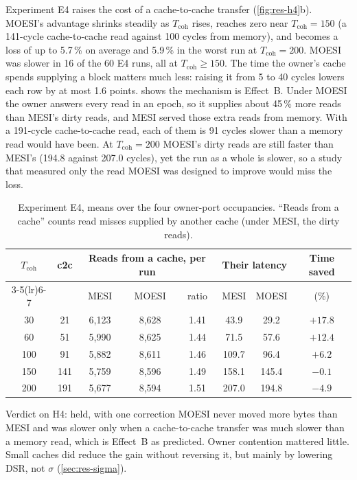 Experiment E4 raises the cost of a cache-to-cache transfer (\cref{fig:res-h4}b).
MOESI's advantage shrinks steadily as $T_{\mathrm{coh}}$ rises, reaches zero near
$T_{\mathrm{coh}}=150$ (a 141-cycle cache-to-cache read against 100 cycles from
memory), and becomes a loss of up to 5.7\,\% on average and 5.9\,\% in the worst run
at $T_{\mathrm{coh}}=200$. MOESI was slower in 16 of the 60 E4 runs, all at
$T_{\mathrm{coh}}\ge150$. The time the owner's cache spends supplying a block
matters much less: raising it from 5 to 40 cycles lowers each row by at most 1.6
points.  shows the mechanism is Effect~B. Under MOESI the
owner answers every read in an epoch, so it supplies about 45\,\% more reads than
MESI's dirty reads, and MESI served those extra reads from memory. With a 191-cycle
cache-to-cache read, each of them is 91 cycles slower than a memory read would have
been. At $T_{\mathrm{coh}}=200$ MOESI's dirty reads are still faster than MESI's
(194.8 against 207.0 cycles), yet the run as a whole is slower, so a study that
measured only the read MOESI was designed to improve would miss the loss.

\begin{table}[htbp]
\centering
\caption{Experiment E4, means over the four owner-port occupancies. ``Reads from a
cache'' counts read misses supplied by another cache (under MESI, the dirty reads).}
\label{tab:res-effectb}
\small
\begin{tabular}{@{}c c c c c c c c@{}}
\toprule
$T_{\mathrm{coh}}$ & c2c & \multicolumn{3}{c}{Reads from a cache, per run} &
  \multicolumn{2}{c}{Their latency} & Time saved \\
\cmidrule(lr){3-5}\cmidrule(lr){6-7}
 & & MESI & MOESI & ratio & MESI & MOESI & (\%) \\
\midrule
30 & 21 & 6,123 & 8,628 & 1.41 & 43.9 & 29.2 & $+17.8$ \\
60 & 51 & 5,990 & 8,625 & 1.44 & 71.5 & 57.6 & $+12.4$ \\
100 & 91 & 5,882 & 8,611 & 1.46 & 109.7 & 96.4 & $+6.2$ \\
150 & 141 & 5,759 & 8,596 & 1.49 & 158.1 & 145.4 & $-0.1$ \\
200 & 191 & 5,677 & 8,594 & 1.51 & 207.0 & 194.8 & $-4.9$ \\
\bottomrule
\end{tabular}
\end{table}

\begin{verdictbox}[amberC]{Verdict on H4: held, with one correction}
MOESI never moved more bytes than MESI and was slower only when a cache-to-cache
transfer was much slower than a memory read, which is Effect~B as predicted. Owner
contention mattered little. Small caches did reduce the gain without reversing it,
but mainly by lowering DSR, not $\sigma$ (\cref{sec:res-sigma}).
\end{verdictbox}

